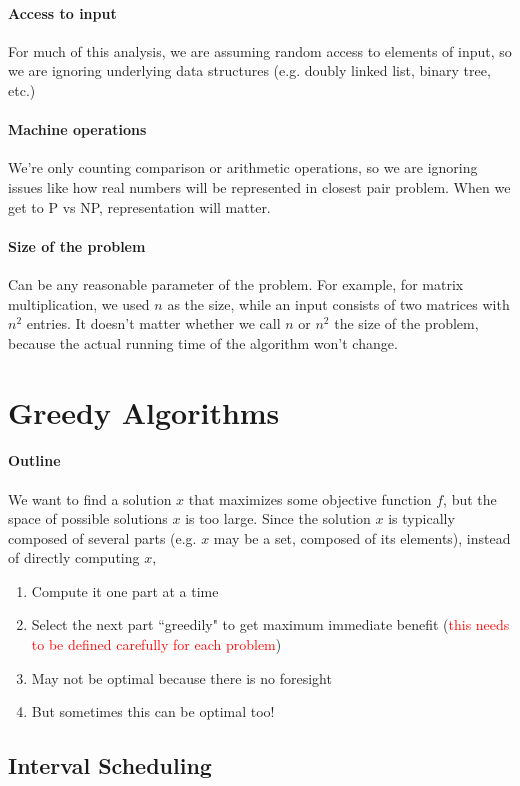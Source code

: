 \documentclass[11pt]{article}
\begin{document}
\paragraph{Access to input}
For much of this analysis, we are assuming random access to elements of input, so we are ignoring underlying data structures (e.g. doubly linked list, binary tree, etc.)

\paragraph{Machine operations}
We're only counting comparison or arithmetic operations, so we are ignoring issues like how real numbers will be represented in closest pair problem. When we get to P vs NP, representation will matter.
\paragraph{Size of the problem}
Can be any reasonable parameter of the problem. For example, for matrix multiplication, we used $n$ as the size, while an input consists of two matrices with $n^2$ entries. It doesn't matter whether we call $n$ or $n^2$ the size of the problem, because the actual running time of the algorithm won't change.

\section{Greedy Algorithms}
\paragraph{Outline}
We want to find a solution $x$ that maximizes some objective function $f$, but the space of possible solutions $x$ is too large. Since the solution $x$ is typically composed of several parts (e.g. $x$ may be a set, composed of its elements), instead of directly computing $x$,
\begin{enumerate}
	\item Compute it one part at a time
	\item Select the next part ``greedily" to get maximum immediate benefit (\textcolor{red}{this needs to be defined carefully for each problem})
	\item May not be optimal because there is no foresight
	\item But sometimes this can be optimal too!
\end{enumerate}

\subsection{Interval Scheduling}
\end{document}
